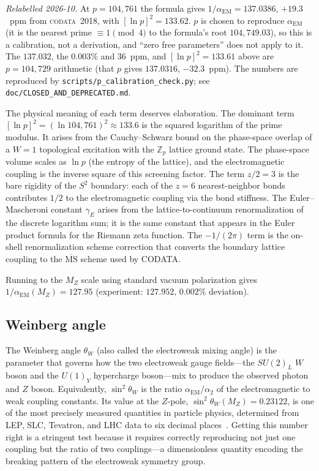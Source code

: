 \documentclass[aps,prd,twocolumn,superscriptaddress,longbibliography,nofootinbib]{revtex4-2}
\newcommand{\Zp}{\mathbb{Z}_p}
\newcommand{\Stwo}{S^2}
\newcommand{\sinW}{\sin^2\!\theta_W}
\newcommand{\alphaEM}{\alpha_{\mathrm{EM}}}
\newcommand{\MZ}{M_Z}
\begin{document}
\textit{Relabelled 2026-10.}  At $p = 104{,}761$ the formula gives
$1/\alphaEM = 137.0386$, $+19.3$~ppm from \textsc{codata}~2018, with
$[\ln p]^2 = 133.62$.  $p$ is chosen to reproduce $\alphaEM$ (it is the
nearest prime $\equiv 1 \pmod 4$ to the formula's root $104{,}749.03$),
so this is a calibration, not a derivation, and ``zero free
parameters'' does not apply to it.  The $137.032$, the $0.003\%$ and
$36$~ppm, and $[\ln p]^2 = 133.61$ above are $p = 104{,}729$ arithmetic
(that $p$ gives $137.0316$, $-32.3$~ppm).  The numbers are reproduced
by \texttt{scripts/p\_calibration\_check.py}; see
\texttt{doc/CLOSED\_AND\_DEPRECATED.md}.

The physical meaning of each term deserves elaboration.
The dominant term $[\ln p]^2 = (\ln 104{,}761)^2 \approx 133.6$
is the squared logarithm of the prime modulus.  It arises from the
Cauchy--Schwarz bound on the phase-space overlap of a $W = 1$
topological excitation with the $\Zp$ lattice ground state.
The phase-space volume scales as $\ln p$ (the entropy of the lattice),
and the electromagnetic coupling is the inverse square of this
screening factor.  The term $z/2 = 3$ is the bare rigidity of the
$\Stwo$ boundary: each of the $z = 6$ nearest-neighbor bonds
contributes $1/2$ to the electromagnetic coupling via the bond stiffness.
The Euler--Mascheroni constant $\gamma_E$ arises from the
lattice-to-continuum renormalization of the discrete logarithm sum;
it is the same constant that appears in the Euler product formula for
the Riemann zeta function.  The $-1/(2\pi)$ term is the on-shell
renormalization scheme correction that converts the boundary
lattice coupling to the $\overline{\mathrm{MS}}$ scheme used by
CODATA.

Running to the $\MZ$ scale using standard vacuum polarization gives
$1/\alphaEM(\MZ) = 127.95$ (experiment: $127.952$, $0.002\%$
deviation).

\subsection{Weinberg angle}

The Weinberg angle $\theta_W$ (also called the electroweak mixing
angle) is the parameter that governs how the two electroweak gauge
fields---the $SU(2)_L$ $W$ boson and the $U(1)_Y$ hypercharge
boson---mix to produce the observed photon and $Z$ boson.
Equivalently, $\sin^2\theta_W$ is the ratio $\alpha_{\mathrm{EM}} /
\alpha_2$ of the electromagnetic to weak coupling constants.  Its
value at the $Z$-pole, $\sinW(M_Z) = 0.23122$, is one of the most
precisely measured quantities in particle physics, determined from
LEP, SLC, Tevatron, and LHC data to six decimal
places~\cite{PDG2024}.  Getting this number right is a stringent test
because it requires correctly reproducing not just one coupling but
the ratio of two couplings---a dimensionless quantity encoding the
breaking pattern of the electroweak symmetry group.
\end{document}
